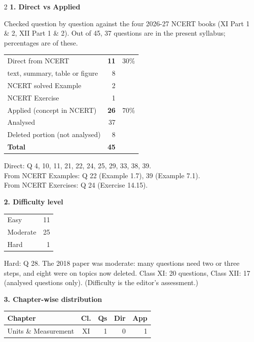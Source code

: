 \begin{multicols}{2}
\textbf{\color{crimson}1. Direct vs Applied}\par\smallskip
{\footnotesize Checked question by question against the four 2026-27 NCERT books (XI Part 1 \& 2, XII Part 1 \& 2). Out of 45, 37 questions are in the present syllabus; percentages are of these.}\par\smallskip
\begin{tabular}{@{}lrr@{}}\toprule
Direct from NCERT & \textbf{11} & 30\%\\
\quad text, summary, table or figure & 8 &\\
\quad NCERT solved Example & 2 &\\
\quad NCERT Exercise & 1 &\\
Applied (concept in NCERT) & \textbf{26} & 70\%\\\midrule
Analysed & 37 &\\
Deleted portion (not analysed) & 8 &\\\midrule
\textbf{Total} & \textbf{45} &\\\bottomrule\end{tabular}\par\smallskip
{\footnotesize Direct: Q 4, 10, 11, 21, 22, 24, 25, 29, 33, 38, 39.\\ From NCERT Examples: Q 22 (Example 1.7), 39 (Example 7.1).\\ From NCERT Exercises: Q 24 (Exercise 14.15).}\par\medskip
\textbf{\color{crimson}2. Difficulty level}\par\smallskip
\begin{tabular}{@{}lr@{}}\toprule
Easy & 11\\ Moderate & 25\\ Hard & 1\\\bottomrule\end{tabular}\par\smallskip
{\footnotesize Hard: Q 28. The 2018 paper was moderate: many questions need two or three steps, and eight were on topics now deleted. Class XI: 20 questions, Class XII: 17 (analysed questions only). (Difficulty is the editor's assessment.)}\par\medskip
\columnbreak
\textbf{\color{crimson}3. Chapter-wise distribution}\par\smallskip
{\footnotesize\begin{tabular}{@{}p{4.7cm}c@{\,}r@{\,}r@{\,}r@{}}\toprule
Chapter & Cl. & Qs & Dir & App\\\midrule
Units \& Measurement & XI & 1 & 0 & 1\\

\end{tabular}}
\end{multicols}
